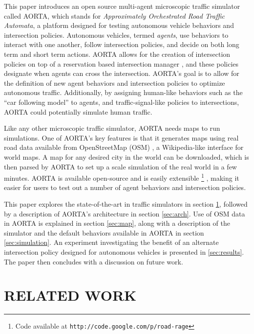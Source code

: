 \documentclass[letterpaper, 10 pt, conference]{ieeeconf}  %
\begin{document}

This paper introduces an open source multi-agent microscopic traffic simulator
called AORTA, which stands for \textit{Approximately Orchestrated Road Traffic
Automata}, a platform designed for testing autonomous vehicle behaviors and
intersection policies. Autonomous vehicles, termed \textit{agents}, use
behaviors to interact with one another, follow intersection policies, and
decide on both long term and short term actions. AORTA allows for the creation
of intersection policies on top of a reservation based intersection manager
\cite{JAIR08-dresner}, and these policies designate when agents can cross the
intersection. AORTA's goal is to allow for the definition of new agent
behaviors and intersection policies to optimize autonomous traffic.
Additionally, by assigning human-like behaviors such as the ``car following
model'' \cite{brackstone1999car} to agents, and traffic-signal-like policies to
intersections, AORTA could potentially simulate human traffic.

Like any other microscopic traffic simulator, AORTA needs maps to run
simulations. One of AORTA's key features is that it generates maps using real
road data available from OpenStreetMap (OSM) \cite{osm}, a Wikipedia-like
interface for world maps. A map for any desired city in the world can be
downloaded, which is then parsed by AORTA to set up a scale simulation of the
real world in a few minutes. AORTA is available open-source and is easily
extensible \footnote{Code available at
\texttt{http://code.google.com/p/road-rage}} , making it easier for users to test out a number of agent
behaviors and intersection policies.

This paper explores the state-of-the-art in traffic simulators in section
\ref{sec:related_work}, followed by a description of AORTA's architecture in
section \ref{sec:arch}.  Use of OSM data in AORTA is explained in section
\ref{sec:map}, along with a description of the simulator and the default
behaviors available in AORTA in section \ref{sec:simulation}. An experiment
investigating the benefit of an alternate intersection policy designed for
autonomous vehicles is presented in \ref{sec:results}. The paper then concludes
with a discussion on future work.


\section{RELATED WORK}
\label{sec:related_work}
\end{document}
